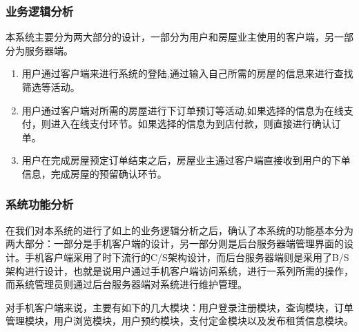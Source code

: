 \documentclass[lang=cn,11pt,a4paper,cite=authoryear]{elegantpaper}
\begin{document}
\subsubsection{业务逻辑分析}

本系统主要分为两大部分的设计，一部分为用户和房屋业主使用的客户端，另一部分为服务器端。

\begin{enumerate}
    \def\labelenumi{\arabic{enumi}.}
    \item
          用户通过客户端来进行系统的登陆,通过输入自己所需的房屋的信息来进行查找筛选等活动。
    \item
          用户通过客户端对所需的房屋进行下订单预订等活动,如果选择的信息为在线支付，则进入在线支付环节。如果选择的信息为到店付款，则直接进行确认订单。
    \item
          用户在完成房屋预定订单结束之后，房屋业主通过客户端直接收到用户的下单信息，完成房屋的预留确认环节。
\end{enumerate}

\subsubsection{系统功能分析}

在我们对本系统的进行了如上的业务逻辑分析之后，确认了本系统的功能基本分为两大部分：一部分是手机客户端的设计，另一部分则是后台服务器端管理界面的设计。手机客户端采用了时下流行的C/S架构设计，而后台服务器端则是采用了B/S架构进行设计，也就是说用户通过手机客户端访问系统，进行一系列所需的操作，而系统管理员则通过后台服务器端对系统进行维护管理。

对手机客户端来说，主要有如下的几大模块：用户登录注册模块，查询模块，订单管理模块，用户浏览模块，用户预约模块，支付定金模块以及发布租赁信息模块。
\end{document}
